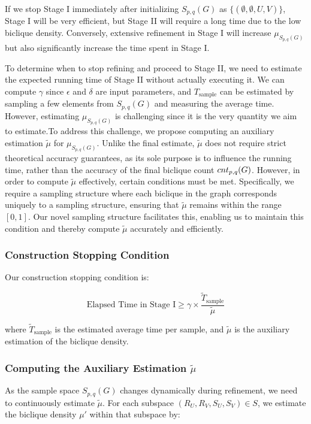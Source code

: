 If we stop Stage I immediately after initializing $ S_{p,q}(G) $ as $ \{(\emptyset, \emptyset, U, V)\} $, Stage I will be very efficient, but Stage II will require a long time due to the low biclique density. Conversely, extensive refinement in Stage I will increase $ \mu_{S_{p,q}(G)} $ but also significantly increase the time spent in Stage I.

To determine when to stop refining and proceed to Stage II, we need to estimate the expected running time of Stage II without actually executing it. We can compute $ \gamma $ since $ \epsilon $ and $ \delta $ are input parameters, and $ T_{\text{sample}} $ can be estimated by sampling a few elements from $ S_{p,q}(G) $ and measuring the average time. However, estimating $ \mu_{S_{p,q}(G)} $ is challenging since it is the very quantity we aim to estimate.To address this challenge, we propose computing an auxiliary estimation $ \tilde{\mu} $ for $ \mu_{S_{p,q}(G)} $. Unlike the final estimate, $ \tilde{\mu} $ does not require strict theoretical accuracy guarantees, as its sole purpose is to influence the running time, rather than the accuracy of the final biclique count ${cnt_{p,q}(G) }$. However, in order to compute $ \tilde{\mu} $ effectively, certain conditions must be met. Specifically, we require a sampling structure where each biclique in the graph corresponds uniquely to a sampling structure, ensuring that $ \tilde{\mu} $ remains within the range $ [0, 1] $.  Our novel sampling structure facilitates this, enabling us to maintain this condition and thereby compute $\tilde{\mu}$ accurately and efficiently.

\subsubsection{Construction Stopping Condition}

Our construction stopping condition is:

\[
\text{Elapsed Time in Stage I} \geq \gamma \times \frac{ \tilde{T}_{\text{sample}}}{\tilde{\mu}}
\]

where $ \tilde{T}_{\text{sample}} $ is the estimated average time per sample, and $ \tilde{\mu} $ is the auxiliary estimation of the biclique density.

\subsubsection{Computing the Auxiliary Estimation $ \tilde{\mu} $}

As the sample space $ S_{p,q}(G) $ changes dynamically during refinement, we need to continuously estimate $ \tilde{\mu} $. For each subspace $ (R_U, R_V, S_U, S_V) \in S $, we estimate the biclique density $ \mu' $ within that subspace by:

